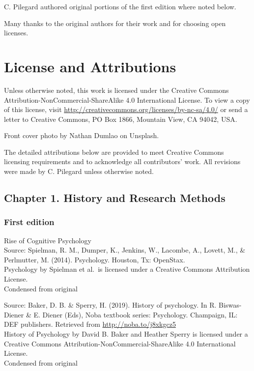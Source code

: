 \documentclass[
]{krantz}
\begin{document}
C. Pilegard authored original portions of the first edition where noted below.

Many thanks to the original authors for their work and for choosing open licenses.

\section*{License and Attributions}\label{license-and-attributions}


Unless otherwise noted, this work is licensed under the Creative Commons Attribution-NonCommercial-ShareAlike 4.0 International License. To view a copy of this license, visit \url{http://creativecommons.org/licenses/by-nc-sa/4.0/} or send a letter to Creative Commons, PO Box 1866, Mountain View, CA 94042, USA.

Front cover photo by Nathan Dumlao on Unsplash.

The detailed attributions below are provided to meet Creative Commons licensing requirements and to acknowledge all contributors' work. All revisions were made by C. Pilegard unless otherwise noted.

\subsection*{Chapter 1. History and Research Methods}\label{chapter-1.-history-and-research-methods}


\subsubsection*{First edition}\label{first-edition-1}


Rise of Cognitive Psychology\\
Source: Spielman, R. M., Dumper, K., Jenkins, W., Lacombe, A., Lovett, M., \& Perlmutter, M. (2014). Psychology. Houston, Tx: OpenStax.\\
Psychology by Spielman et al.~is licensed under a Creative Commons Attribution License.\\
Condensed from original

Source: Baker, D. B. \& Sperry, H. (2019). History of psychology. In R. Biswas-Diener \& E. Diener (Eds), Noba textbook series: Psychology. Champaign, IL: DEF publishers. Retrieved from \url{http://noba.to/j8xkgcz5}\\
History of Psychology by David B. Baker and Heather Sperry is licensed under a Creative Commons Attribution-NonCommercial-ShareAlike 4.0 International License.\\
Condensed from original
\end{document}
